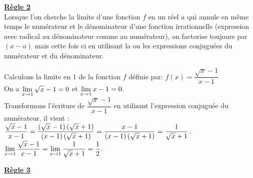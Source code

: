 \underline{\textbf{Règle 2}}\\

Lorsque l'on cherche la limite d'une fonction $ f $ en un réel $ a $ qui annule en même
temps le numérateur et le dénominateur d'une fonction irrationnelle (expression
avec radical au dénominateur comme au numérateur), on factorise toujours par
$( x - a )$ mais cette fois ci en utilisant la ou les expressions conjuguées du
numérateur et du dénominateur. 
\begin{example}

Calculons la limite en $ 1 $ de la fonction $ f $ définie par:  \;$ f(x)=\dfrac{\sqrt{x}-1}{x-1} $\\
 On a $ \displaystyle \lim_{x\to 1}\sqrt{x}-1=0 $ et $ \displaystyle \lim_{x\to 1}x-1=0 $.\\Transformons l'écriture de  $ \dfrac{\sqrt{x}-1}{x-1} $ en utilisant l'expression conjuguée du
numérateur, il vient :\\ $ \dfrac{\sqrt{x}-1}{x-1}= \dfrac{\left(\sqrt{x}-1\right)\left(\sqrt{x}+1\right)}{(x-1)\left(\sqrt{x}+1\right)} =\dfrac{x-1}{(x-1)\left(\sqrt{x}+1\right)}=\dfrac{1}{\sqrt{x}+1}$.\\ $ \displaystyle \lim_{x\to 1}\dfrac{\sqrt{x}-1}{x-1}= \displaystyle \lim_{x\to 1}\dfrac{1}{\sqrt{x}+1}=\dfrac{1}{2}$.
\end{example}

 \underline{\textbf{Règle 3}}\\

